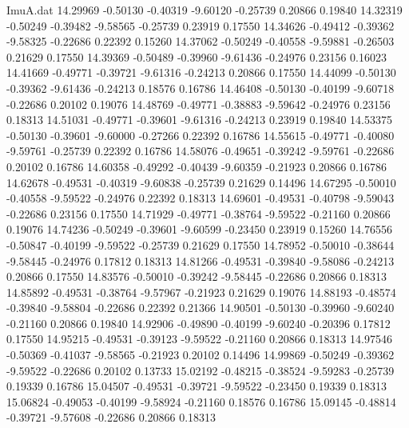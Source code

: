 \begin{filecontents}{ImuA.dat}
  14.29969   -0.50130   -0.40319   -9.60120   -0.25739    0.20866    0.19840
  14.32319   -0.50249   -0.39482   -9.58565   -0.25739    0.23919    0.17550
  14.34626   -0.49412   -0.39362   -9.58325   -0.22686    0.22392    0.15260
  14.37062   -0.50249   -0.40558   -9.59881   -0.26503    0.21629    0.17550
  14.39369   -0.50489   -0.39960   -9.61436   -0.24976    0.23156    0.16023
  14.41669   -0.49771   -0.39721   -9.61316   -0.24213    0.20866    0.17550
  14.44099   -0.50130   -0.39362   -9.61436   -0.24213    0.18576    0.16786
  14.46408   -0.50130   -0.40199   -9.60718   -0.22686    0.20102    0.19076
  14.48769   -0.49771   -0.38883   -9.59642   -0.24976    0.23156    0.18313
  14.51031   -0.49771   -0.39601   -9.61316   -0.24213    0.23919    0.19840
  14.53375   -0.50130   -0.39601   -9.60000   -0.27266    0.22392    0.16786
  14.55615   -0.49771   -0.40080   -9.59761   -0.25739    0.22392    0.16786
  14.58076   -0.49651   -0.39242   -9.59761   -0.22686    0.20102    0.16786
  14.60358   -0.49292   -0.40439   -9.60359   -0.21923    0.20866    0.16786
  14.62678   -0.49531   -0.40319   -9.60838   -0.25739    0.21629    0.14496
  14.67295   -0.50010   -0.40558   -9.59522   -0.24976    0.22392    0.18313
  14.69601   -0.49531   -0.40798   -9.59043   -0.22686    0.23156    0.17550
  14.71929   -0.49771   -0.38764   -9.59522   -0.21160    0.20866    0.19076
  14.74236   -0.50249   -0.39601   -9.60599   -0.23450    0.23919    0.15260
  14.76556   -0.50847   -0.40199   -9.59522   -0.25739    0.21629    0.17550
  14.78952   -0.50010   -0.38644   -9.58445   -0.24976    0.17812    0.18313
  14.81266   -0.49531   -0.39840   -9.58086   -0.24213    0.20866    0.17550
  14.83576   -0.50010   -0.39242   -9.58445   -0.22686    0.20866    0.18313
  14.85892   -0.49531   -0.38764   -9.57967   -0.21923    0.21629    0.19076
  14.88193   -0.48574   -0.39840   -9.58804   -0.22686    0.22392    0.21366
  14.90501   -0.50130   -0.39960   -9.60240   -0.21160    0.20866    0.19840
  14.92906   -0.49890   -0.40199   -9.60240   -0.20396    0.17812    0.17550
  14.95215   -0.49531   -0.39123   -9.59522   -0.21160    0.20866    0.18313
  14.97546   -0.50369   -0.41037   -9.58565   -0.21923    0.20102    0.14496
  14.99869   -0.50249   -0.39362   -9.59522   -0.22686    0.20102    0.13733
  15.02192   -0.48215   -0.38524   -9.59283   -0.25739    0.19339    0.16786
  15.04507   -0.49531   -0.39721   -9.59522   -0.23450    0.19339    0.18313
  15.06824   -0.49053   -0.40199   -9.58924   -0.21160    0.18576    0.16786
  15.09145   -0.48814   -0.39721   -9.57608   -0.22686    0.20866    0.18313

\end{filecontents}
